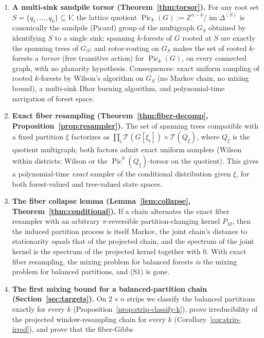 \documentclass[11pt]{article}
\newcommand{\Z}{\mathbb{Z}}
\newcommand{\PicO}[1]{\operatorname{Pic}^0(#1)}
\newcommand{\Pick}[1]{\operatorname{Pic}_k(#1)}
\newcommand{\im}{\operatorname{im}}
\newcommand{\Tcal}{\mathcal{T}}
\begin{document}
\begin{enumerate}[(C1)]
  \item \textbf{A multi-sink sandpile torsor
    (Theorem~\ref{thm:torsor}).} For any root set
    $S = \{q_1, \ldots, q_k\} \subseteq V$, the lattice quotient
    $\Pick{G} := \Z^{n-k} / \im \Delta^{(S)}$ is canonically the sandpile
    (Picard) group of the multigraph $G_S$ obtained by identifying $S$ to a
    single sink; spanning $k$-forests of $G$ rooted at $S$ are exactly the
    spanning trees of $G_S$; and rotor-routing on $G_S$ makes the set of
    rooted $k$-forests a \emph{torsor} (free transitive action) for
    $\Pick{G}$, on every connected graph, with no planarity hypothesis.
    Consequences: exact uniform sampling of rooted $k$-forests by Wilson's
    algorithm on $G_S$ (no Markov chain, no mixing bound), a multi-sink
    Dhar burning algorithm, and polynomial-time navigation of forest space.
  \item \textbf{Exact fiber resampling
    (Theorem~\ref{thm:fiber-decomp}, Proposition~\ref{prop:resampler}).}
    The set of spanning trees compatible with a fixed partition $\xi$
    factorizes as
    $\prod_i \Tcal(G[\xi_i]) \times \Tcal(Q_\xi)$, where $Q_\xi$ is the
    quotient multigraph; both factors admit exact uniform samplers (Wilson
    within districts; Wilson or the $\PicO{Q_\xi}$-torsor on the quotient).
    This gives a polynomial-time \emph{exact} sampler of the conditional
    distribution given $\xi$, for both forest-valued and tree-valued state
    spaces.
  \item \textbf{The fiber collapse lemma (Lemma~\ref{lem:collapse},
    Theorem~\ref{thm:conditional}).} If a chain alternates the exact fiber
    resampler with an arbitrary $\pi$-reversible partition-changing kernel
    $P_M$, then the induced partition process is itself Markov, the joint
    chain's distance to stationarity \emph{equals} that of the projected
    chain, and the spectrum of the joint kernel is the spectrum of the
    projected kernel together with $0$. With exact fiber resampling,
    the mixing problem for balanced forests \emph{is} the mixing problem
    for balanced partitions, and (S1) is gone.
  \item \textbf{The first mixing bound for a balanced-partition chain
    (Section~\ref{sec:targets}).} On $2 \times n$ strips we classify the
    balanced partitions exactly for every $k$
    (Proposition~\ref{prop:strip-classify-k}), prove irreducibility of
    the projected window-resampling chain for every $k$
    (Corollary~\ref{cor:strip-irred}), and prove that the fiber-Gibbs

\end{enumerate}
\end{document}
